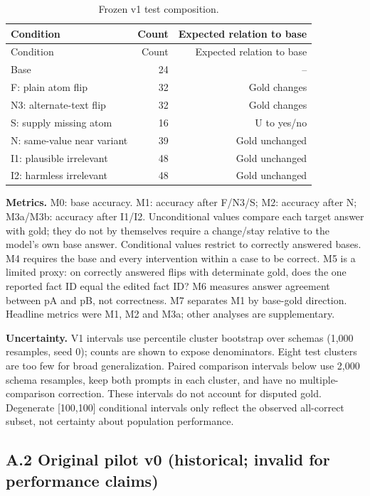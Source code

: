 \documentclass[11pt,a4paper]{article}
\begin{document}
\begingroup\small\setlength{\tabcolsep}{4pt}
\begin{longtable}{lrr}
\caption{Frozen v1 test composition.}\\
\toprule
Condition & Count & Expected relation to base \\
\midrule\endfirsthead
\toprule
Condition & Count & Expected relation to base \\
\midrule\endhead
\bottomrule\endfoot
Base & 24 & -- \\
F: plain atom flip & 32 & Gold changes \\
N3: alternate-text flip & 32 & Gold changes \\
S: supply missing atom & 16 & U to yes/no \\
N: same-value near variant & 39 & Gold unchanged \\
I1: plausible irrelevant & 48 & Gold unchanged \\
I2: harmless irrelevant & 48 & Gold unchanged \\
\end{longtable}\endgroup


\textbf{Metrics.} M0: base accuracy. M1: accuracy after F/N3/S; M2: accuracy after N; M3a/M3b: accuracy after I1/I2. Unconditional values compare each target answer with gold; they do not by themselves require a change/stay relative to the model's own base answer. Conditional values restrict to correctly answered bases. M4 requires the base and every intervention within a case to be correct. M5 is a limited proxy: on correctly answered flips with determinate gold, does the one reported fact ID equal the edited fact ID? M6 measures answer agreement between pA and pB, not correctness. M7 separates M1 by base-gold direction. Headline metrics were M1, M2 and M3a; other analyses are supplementary.

\textbf{Uncertainty.} V1 intervals use percentile cluster bootstrap over schemas (1,000 resamples, seed 0); counts are shown to expose denominators. Eight test clusters are too few for broad generalization. Paired comparison intervals below use 2,000 schema resamples, keep both prompts in each cluster, and have no multiple-comparison correction. These intervals do not account for disputed gold. Degenerate [100,100] conditional intervals only reflect the observed all-correct subset, not certainty about population performance.

\subsection*{A.2 Original pilot v0 (historical; invalid for performance claims)}
\end{document}

